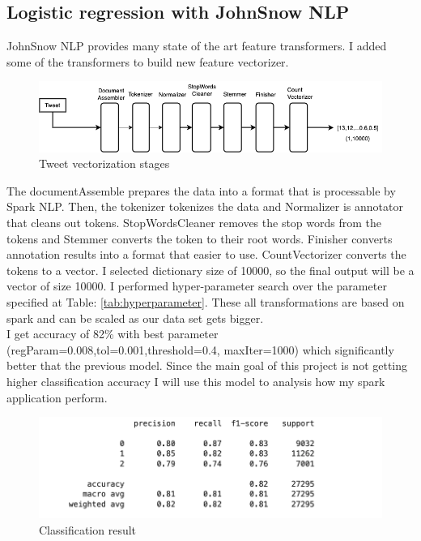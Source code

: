 \documentclass[12pt,a4paper]{report}
\begin{document}
\subsection{Logistic regression with JohnSnow NLP}
JohnSnow NLP provides many state of the art feature transformers. I added some of the transformers to build new feature vectorizer.
\begin{figure}[H]
    \centering
\includegraphics[width=1\textwidth]{images/LR_2.drawio.png}
    \caption{Tweet vectorization stages}
    \label{fig:confusion-svm}
\end{figure}

The documentAssemble prepares the data into a format that is processable by Spark NLP. Then, the tokenizer tokenizes the data and Normalizer is annotator that cleans out tokens. StopWordsCleaner removes the stop words from the tokens and Stemmer converts the token to their root words. Finisher converts annotation results into a format that easier to use. CountVectorizer converts the tokens to a vector. I selected dictionary size of 10000, so the final output will be a vector of size 10000. I performed hyper-parameter search over the parameter specified at Table: \ref{tab:hyperparameter}. These all transformations are based on spark and can be scaled as our data set gets bigger.\\

I get accuracy of 82\% with best parameter (regParam=0.008,tol=0.001,threshold=0.4, maxIter=1000) which significantly better that the previous model. Since the main goal of this project is not getting higher classification accuracy I will use this model to analysis how my spark application perform.

\begin{figure}[H]
    \centering
\includegraphics[width=1\textwidth]{images/lr_js.png}
    \caption{Classification result}
    \label{fig:confusion-svm}
\end{figure}
\end{document}

